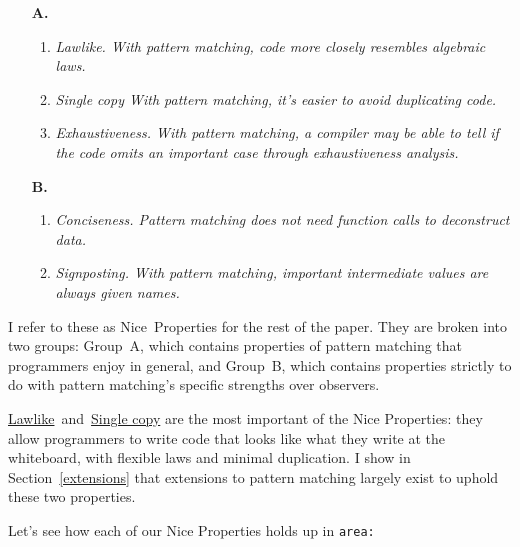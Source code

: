 \documentclass[manuscript,screen,review, 12pt, nonacm]{acmart}
\begin{document}
    \begin{enumerate}
      \item [\textbf{A.}]
      \begin{enumerate}[label=\arabic*]
        \item  \it{Lawlike.} With pattern matching, code more closely
        resembles algebraic laws. 
        \label{p1}
        \item \it{Single copy} With pattern matching, it's easier to avoid
        duplicating code.
        \label{p2}
        \item \it{Exhaustiveness.} With pattern matching, a compiler may be
        able to tell if the code omits an important case through
        \it{exhaustiveness analysis}.
        \label{p5}
    \end{enumerate}

    \item [\textbf{B.}]
    \begin{enumerate}[start=4, label=\arabic*]
      \item \it{Conciseness.} Pattern matching does not need function
      calls to deconstruct data. \nolinebreak
      \label{p3}
      \item \it{Signposting.} With pattern matching, important
      intermediate values are always given names. 
      \nolinebreak
      \label{p4}
    \end{enumerate}
  \end{enumerate}

    I refer to these as Nice~Properties for the rest of the paper. They are broken
    into two groups: Group~A, which contains properties of pattern matching that
    programmers enjoy in general, and Group~B,  which contains properties strictly
    to do with pattern matching's specific strengths over observers. 

    \hyperref[p1]{Lawlike}~and~\hyperref[p1]{Single copy} are the most important
    of the Nice Properties: they allow programmers to write code that looks like
    what they write at the whiteboard, with flexible laws and minimal
    duplication. I show in Section~\ref{extensions} that extensions to pattern
    matching largely exist to uphold these two properties. 
    
    Let's see how each of our Nice Properties holds up in \tt{area}: 
    
\end{document}
